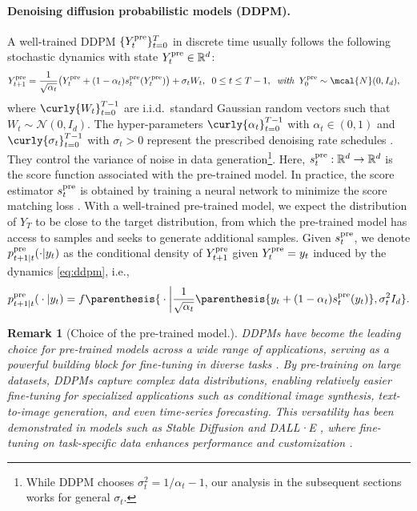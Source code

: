 \documentclass{article}
\newtheorem{Remark}[Theorem]{Remark}
\begin{document}
\paragraph{Denoising diffusion probabilistic models (DDPM).} A well-trained DDPM $\{Y_t^{\rm pre}\}_{t=0}^T$ in discrete time usually follows the following stochastic dynamics with state $Y_t^{\rm pre}\in \mathbb{R}^d$:
\begin{align}
    Y_{t+1}^{\rm pre} & = \frac{1}{\sqrt{\alpha_t}}\big(Y_t^{\rm pre} + (1 - \alpha_t)s^{\rm pre}_t(Y_t^{\rm pre})\big) + \sigma_t W_t,   \;\; 0 \leq t \leq T - 1, \;\; \textit{with}\;\; Y_0^{\rm pre} \sim \mcal{N}(0, I_d),\label{eq:ddpm}
\end{align}
where $\curly{W_t}_{t = 0}^{T - 1}$ are i.i.d.~standard Gaussian random vectors such that $W_t\sim \mathcal{N}(0,I_d)$. The hyper-parameters $\curly{\alpha_t}_{t=0}^{T-1}$ with  $\alpha_t\in (0, 1)$ and $\curly{\sigma_t}_{t=0}^{T-1}$ with $\sigma_t>0$ represent the prescribed denoising rate schedules \cite{Ho20,li2023towards}. They control the variance of noise in data generation\footnote{While DDPM chooses $\sigma_t^2 = 1/\alpha_t - 1$, our analysis in the subsequent sections works for general $\sigma_t$.}.  Here, $s^{\rm pre}_t:\mathbb{R}^d \rightarrow\mathbb{R}^d$ is the score function associated with the pre-trained model. In practice, the score estimator $s_t^{\rm pre}$  is obtained by training a neural network to minimize the score matching loss \cite{hyvarinen2005estimation}. {With a well-trained pre-trained model, we expect the distribution of $Y_T$ to be close to the target distribution, from which the pre-trained model has access to samples and seeks to generate additional samples.} Given $s_t^{\rm pre}$, we denote $ p_{t+1 \vert t}^{\rm pre}(\cdot \vert y_t) $ as the conditional density of $Y_{t+1}^{\rm pre}$ given $Y_t^{\rm pre} = y_t$ induced by the dynamics \eqref{eq:ddpm}, i.e., 
\begin{align*}
    p_{t+1\vert t}^{\rm pre}({}\cdot{}\vert y_{t}) = f\parenthesis{{}\cdot{}\bigg\vert\frac{1}{\sqrt{\alpha_t}}\parenthesis{y_t + (1 - \alpha_t)s^{\rm pre}_t(y_t)}, \sigma_{t}^{2} I_d}.
\end{align*}


%

\begin{Remark}[Choice of the pre-trained model.]
    DDPMs have become the leading choice for pre-trained models across a wide range of applications, serving as a powerful building block for fine-tuning in diverse tasks \cite{dhariwal2021diffusion,Ho20,watson2023novo,li2023towards}.  By pre-training on large datasets, DDPMs capture complex data distributions, enabling relatively easier fine-tuning for specialized applications such as conditional image synthesis, text-to-image generation, and even time-series forecasting. This versatility has been demonstrated in models such as Stable Diffusion \cite{rombach2022high} and DALL·E \cite{ramesh2022hierarchical}, where fine-tuning on task-specific data enhances performance and customization \cite{fan2024reinforcement}. 
\end{Remark}
\end{document}
